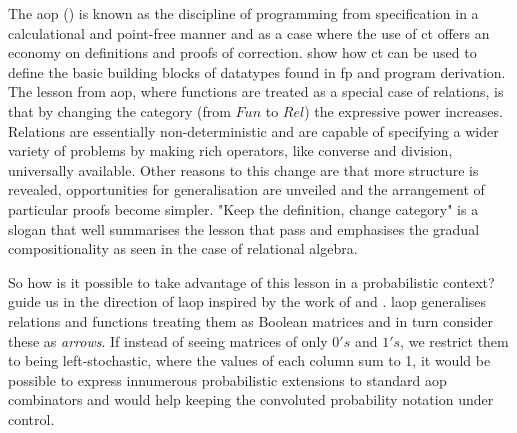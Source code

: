 \documentclass[
  oneside,
  11pt, a4paper,
  footinclude=true,
  headinclude=true,
  cleardoublepage=empty
]{scrbook}
\theoremstyle{definition}
\theoremstyle{definition}
\begin{document}
	        The \gls{aop} (\cite{Bird:1997:AP:248932}) is known as the discipline of programming from specification in a calculational and point-free manner and as a case where the use of \gls{ct} offers an economy on definitions and proofs of correction. \cite{Bird:1997:AP:248932} show how \gls{ct} can be used to define the basic building blocks of datatypes found in \gls{fp} and program derivation. The lesson from \gls{aop}, where functions are treated as a special case of relations, is that by changing the category (from $Fun$ to $Rel$) the expressive power increases. Relations are essentially non-deterministic and are capable of specifying a wider variety of problems by making rich operators, like converse and division, universally available. Other reasons to this change are that more structure is revealed, opportunities for generalisation are unveiled and the arrangement of particular proofs become simpler. "Keep the definition, change category" is a slogan that well summarises the lesson that \cite{Bird:1997:AP:248932} pass and emphasises the gradual compositionality as seen in the case of relational algebra.
	        
	        So how is it possible to take advantage of this lesson in a probabilistic context? \cite{Oliveira2016KeepDC} guide us in the direction of \gls{laop} inspired by the work of \cite{Macedo2012MatricesAA} and \cite{oliveira2012towards}. \gls{laop} generalises relations and functions treating them as Boolean matrices and in turn consider these as \emph{arrows}. If instead of seeing matrices of only $0's$ and $1's$, we restrict them to being left-stochastic, where the values of each column sum to 1, it would be possible to express innumerous probabilistic extensions to standard \gls{aop} combinators and would help keeping the convoluted probability notation under control.
	        
\end{document}
